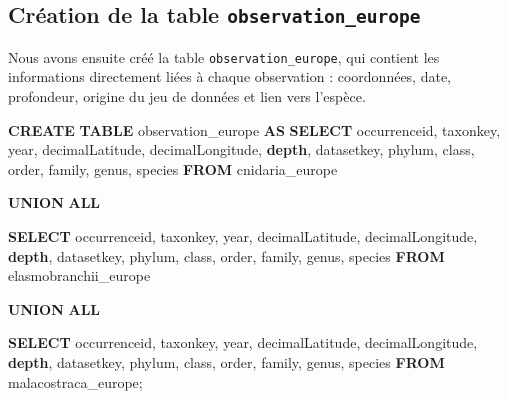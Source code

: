 \documentclass[mstat,12pt]{unswthesis}
\newenvironment{Shaded}{\begin{snugshade}}{\end{snugshade}}
\newcommand{\FunctionTok}[1]{\textcolor[rgb]{0.13,0.29,0.53}{\textbf{#1}}}
\newcommand{\KeywordTok}[1]{\textcolor[rgb]{0.13,0.29,0.53}{\textbf{#1}}}
\newcommand{\NormalTok}[1]{#1}
\begin{document}
\subsection{\texorpdfstring{Création de la table
\texttt{observation\_europe}}{Création de la table observation\_europe}}\label{cruxe9ation-de-la-table-observation_europe-1}

Nous avons ensuite créé la table \texttt{observation\_europe}, qui
contient les informations directement liées à chaque observation :
coordonnées, date, profondeur, origine du jeu de données et lien vers
l'espèce.

\begin{Shaded}
\begin{Highlighting}[]
\KeywordTok{CREATE} \KeywordTok{TABLE}\NormalTok{ observation\_europe }\KeywordTok{AS}
\KeywordTok{SELECT}
\NormalTok{    occurrenceid,}
\NormalTok{    taxonkey,}
\NormalTok{    \textasciigrave{}year\textasciigrave{},}
\NormalTok{    decimalLatitude,}
\NormalTok{    decimalLongitude,}
    \FunctionTok{depth}\NormalTok{,}
\NormalTok{    datasetkey,}
\NormalTok{    phylum,}
\NormalTok{    \textasciigrave{}class\textasciigrave{},}
\NormalTok{    \textasciigrave{}order\textasciigrave{},}
\NormalTok{    family,}
\NormalTok{    genus,}
\NormalTok{    species}
\KeywordTok{FROM}\NormalTok{ cnidaria\_europe}

\KeywordTok{UNION} \KeywordTok{ALL}

\KeywordTok{SELECT}
\NormalTok{    occurrenceid,}
\NormalTok{    taxonkey,}
\NormalTok{    \textasciigrave{}year\textasciigrave{},}
\NormalTok{    decimalLatitude,}
\NormalTok{    decimalLongitude,}
    \FunctionTok{depth}\NormalTok{,}
\NormalTok{    datasetkey,}
\NormalTok{    phylum,}
\NormalTok{    \textasciigrave{}class\textasciigrave{},}
\NormalTok{    \textasciigrave{}order\textasciigrave{},}
\NormalTok{    family,}
\NormalTok{    genus,}
\NormalTok{    species}
\KeywordTok{FROM}\NormalTok{ elasmobranchii\_europe}

\KeywordTok{UNION} \KeywordTok{ALL}

\KeywordTok{SELECT}
\NormalTok{    occurrenceid,}
\NormalTok{    taxonkey,}
\NormalTok{    \textasciigrave{}year\textasciigrave{},}
\NormalTok{    decimalLatitude,}
\NormalTok{    decimalLongitude,}
    \FunctionTok{depth}\NormalTok{,}
\NormalTok{    datasetkey,}
\NormalTok{    phylum,}
\NormalTok{    \textasciigrave{}class\textasciigrave{},}
\NormalTok{    \textasciigrave{}order\textasciigrave{},}
\NormalTok{    family,}
\NormalTok{    genus,}
\NormalTok{    species}
\KeywordTok{FROM}\NormalTok{ malacostraca\_europe;}
\end{Highlighting}
\end{Shaded}
\end{document}
